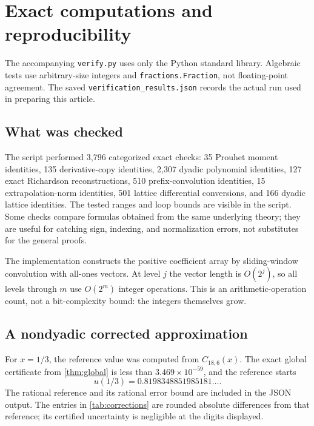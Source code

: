 \documentclass[11pt,a4paper]{article}
\numberwithin{equation}{section}
\theoremstyle{definition}
\begin{document}
\section{Exact computations and reproducibility}\label{sec:computations}

The accompanying \texttt{verify.py} uses only the Python standard
library. Algebraic tests use arbitrary-size integers and
\texttt{fractions.Fraction}, not floating-point agreement. The saved
\texttt{verification\_results.json} records the actual run used in
preparing this article.

\subsection{What was checked}

The script performed 3,796 categorized exact checks: 35 Prouhet
moment identities, 135 derivative-copy identities, 2,307 dyadic
polynomial identities, 127 exact Richardson reconstructions, 510
prefix-convolution identities, 15 extrapolation-norm identities,
501 lattice differential conversions, and 166 dyadic lattice
identities. The tested ranges and loop bounds are visible in the
script. Some checks compare formulas obtained from the same
underlying theory; they are useful for catching sign, indexing,
and normalization errors, not substitutes for the general proofs.

The implementation constructs the positive coefficient array by
sliding-window convolution with all-ones vectors. At level $j$ the
vector length is $O(2^j)$, so all levels through $m$ use $O(2^m)$
integer operations. This is an arithmetic-operation count, not a
bit-complexity bound: the integers themselves grow.

\subsection{A nondyadic corrected approximation}

For $x=1/3$, the reference value was computed from $C_{18,6}(x)$.
The exact global certificate from \cref{thm:global} is less than
$3.469\times10^{-59}$, and the reference starts
\begin{equation}
 u(1/3)=0.8198348851985181\ldots.
\end{equation}
The rational reference and its rational error bound are included
in the JSON output. The entries in \cref{tab:corrections} are
rounded absolute differences from that reference; its certified
uncertainty is negligible at the digits displayed.
\end{document}

